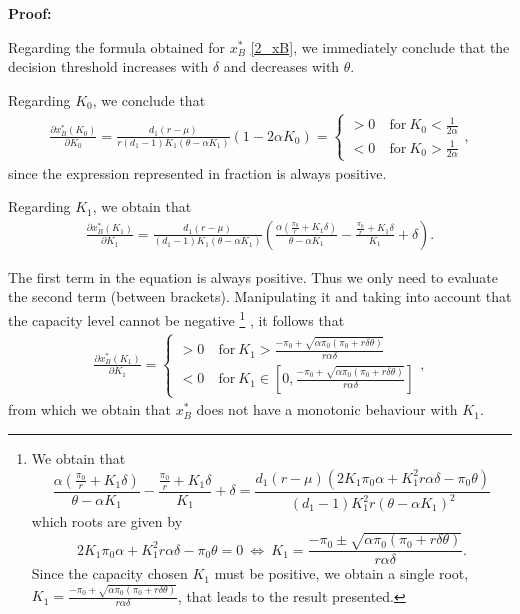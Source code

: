 \textbf{Proof:}

Regarding the formula obtained for  $x^*_B$ \eqref{2_xB}, we immediately conclude that the decision threshold increases with $\delta$ and decreases with $\theta$.


Regarding $K_0$, we conclude that
\begin{align*}
\frac{\partial x^*_B ( K_0 ) }{\partial K_0}= 
\frac{d_1 (r-\mu )}{r (d_1-1)K_1(\theta-\alpha K_1)} (1-2\alpha K_0)
=
\begin{cases}
>0 &\ \text{for} \ K_0<\frac{1}{2 \alpha}\\
<0 &\ \text{for} \ K_0>\frac{1}{2 \alpha}
\end{cases},
\end{align*}
since the expression represented in fraction is always positive.


Regarding $K_1$, we obtain that
\begin{align*}
\frac{\partial x^*_B ( K_1 ) }{\partial K_1}= 
\frac{d_1 (r-\mu )}{ (d_1-1)K_1(\theta-\alpha K_1)}  \left( \frac{\alpha (\frac{\pi_0}{r}+K_1 \delta )}{\theta-\alpha K_1} -\frac{ \frac{\pi_0}{r}+K_1 \delta }{K_1}+ \delta \right).
\end{align*}


The first term in the equation is always positive. Thus we only need to evaluate the second term (between brackets). Manipulating it and taking into account that the capacity level cannot be negative
\footnote{We obtain that 
	$$\frac{\alpha (\frac{\pi_0}{r}+K_1 \delta )}{\theta-\alpha K_1} -\frac{ \frac{\pi_0}{r}+K_1 \delta }{K_1}+ \delta =
\frac{d_1 (r-\mu) (2K_1 \pi_0 \alpha+K^2_1r \alpha \delta -\pi_0 \theta)}{(d_1-1)K_1^2r(\theta-\alpha K_1)^2}$$
which roots are given by
$$ 2K_1 \pi_0 \alpha+K^2_1r \alpha \delta -\pi_0 \theta =0  \ \Leftrightarrow \ K_1=\frac{-\pi_0 \pm \sqrt{\alpha \pi_0 (\pi_0 + r \delta \theta)}}{ r\alpha \delta}.
$$
Since the capacity chosen $K_1$ must be positive, we obtain a single root, $K_1=\frac{-\pi_0 + \sqrt{\alpha \pi_0 (\pi_0 + r \delta \theta)}}{ r\alpha \delta}$, that leads to the result presented.}
, it follows that
\begin{align*}
\frac{\partial x^*_B ( K_1 ) }{\partial K_1}= 
\begin{cases}
>0 &\ \text{for} \ K_1>\frac{-\pi_0+\sqrt{\alpha \pi_0 (\pi_0 + r \delta \theta)}}{ r\alpha \delta}\\
<0 &\ \text{for} \ K_1 \in \left[ 0, \frac{-\pi_0+\sqrt{\alpha \pi_0(\pi_0 + r \delta \theta)}}{ r\alpha \delta} \right]
\end{cases},
\end{align*}
from which we obtain that $x^*_B$ does not have a monotonic behaviour with $K_1$.


